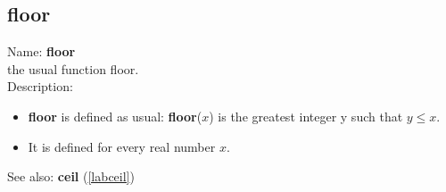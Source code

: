 \subsection{floor}
\label{labfloor}
\noindent Name: \textbf{floor}\\
the usual function floor.\\
\noindent Description: \begin{itemize}

\item \textbf{floor} is defined as usual: \textbf{floor}($x$) is the greatest integer y such that $y \le x$.

\item It is defined for every real number $x$.
\end{itemize}
See also: \textbf{ceil} (\ref{labceil})
